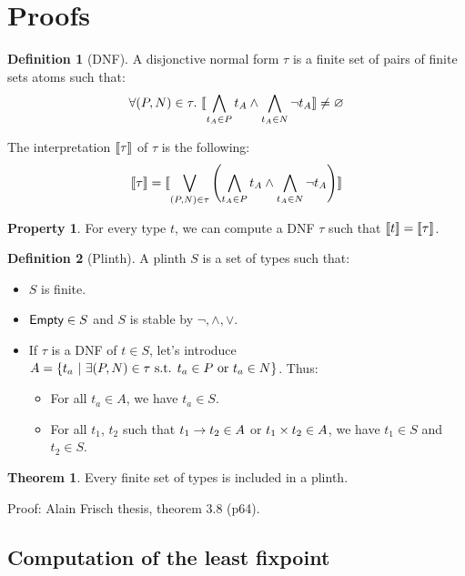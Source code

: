 \documentclass[a4paper]{article}
\theoremstyle{definition}
\newtheorem{theorem}{Theorem}
\newtheorem{definition}{Definition}
\newtheorem{property}{Property}
\begin{document}
    \section{Proofs}

    \begin{definition}[DNF]
      A disjonctive normal form $\tau$ is a finite set of pairs of finite sets atoms such that:
      \[ \forall (P,N)\in \tau.\ {\llbracket \bigwedge_{t_A \in P} t_A \land \bigwedge_{t_A \in N} \neg t_A \rrbracket} \neq \varnothing \]

      The interpretation ${\llbracket \tau \rrbracket}$ of $\tau$ is the following:
      \[
        {\llbracket \tau \rrbracket} = {\llbracket \bigvee_{(P,N)\in \tau} \left(\bigwedge_{t_A \in P} t_A \land \bigwedge_{t_A \in N} \neg t_A \right) \rrbracket}
      \]
    \end{definition}

    \begin{property}
      For every type $t$, we can compute a DNF $\tau$ such that ${\llbracket t \rrbracket} = {\llbracket \tau \rrbracket}$.
    \end{property}

    \begin{definition}[Plinth]
      A plinth $S$ is a set of types such that:
      \begin{itemize}
        \item $S$ is finite.
        \item $\textsf{Empty} \in S$ and $S$ is stable by $\neg, \land, \vee$. 
        \item If $\tau$ is a DNF of $t\in S$, let's introduce $A=\{t_a ~|~ \exists (P,N) \in \tau \text{ s.t. } t_a \in P \text{ or } t_a \in N \}$. Thus:
        \begin{itemize}
          \item For all $t_a \in A$, we have $t_a \in S$.
          \item For all $t_1$, $t_2$ such that $t_1\to t_2 \in A$ or $t_1\times t_2 \in A$,
          we have $t_1 \in S$ and $t_2 \in S$.
        \end{itemize}
      \end{itemize}
    \end{definition}

    \begin{theorem}
      Every finite set of types is included in a plinth.
    \end{theorem}

    Proof: Alain Frisch thesis, theorem 3.8 (p64).

    \subsection{Computation of the least fixpoint}
\end{document}
